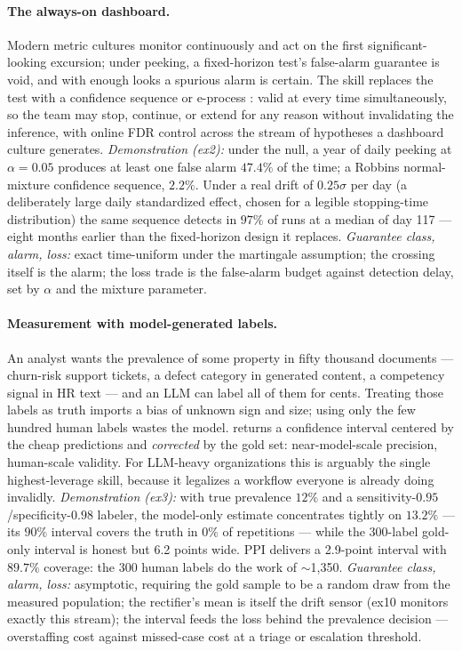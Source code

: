 \documentclass[11pt,a4paper]{article}
\begin{document}
\paragraph{The always-on dashboard.} Modern metric cultures monitor
continuously and act on the first significant-looking excursion; under
peeking, a fixed-horizon test's false-alarm guarantee is void, and with
enough looks a spurious alarm is certain. The 
skill replaces the test with a confidence sequence or e-process
\citep{howard2021,ramdas2023}: valid at every time simultaneously, so the
team may stop, continue, or extend for any reason without invalidating the
inference, with online FDR control across the stream of hypotheses a
dashboard culture generates. \emph{Demonstration (ex2):} under the null, a
year of daily peeking at $\alpha=0.05$ produces at least one false alarm
$47.4\%$ of the time; a Robbins normal-mixture confidence sequence,
$2.2\%$. Under a real drift of $0.25\sigma$ per day (a deliberately large daily
standardized effect, chosen for a legible stopping-time distribution) the
same sequence detects in $97\%$ of runs at a median of day 117 --- eight
months earlier than the fixed-horizon design it replaces. \emph{Guarantee
class, alarm, loss:} exact time-uniform under the martingale assumption;
the crossing itself is the alarm; the loss trade is the false-alarm budget
against detection delay, set by $\alpha$ and the mixture parameter.

\paragraph{Measurement with model-generated labels.} An analyst wants the
prevalence of some property in fifty thousand documents --- churn-risk
support tickets, a defect category in generated content, a competency
signal in HR text --- and an LLM can label all of them for cents. Treating
those labels as truth imports a bias of unknown sign and size; using only
the few hundred human labels wastes the model.
 \citep{angelopoulos2023ppi}
returns a confidence interval centered by the cheap predictions and
\emph{corrected} by the gold set: near-model-scale precision, human-scale
validity. For LLM-heavy organizations this is arguably the single
highest-leverage skill, because it legalizes a workflow everyone is
already doing invalidly. \emph{Demonstration (ex3):} with true prevalence
$12\%$ and a sensitivity-$0.95$/specificity-$0.98$ labeler, the model-only
estimate concentrates tightly on $13.2\%$ --- its $90\%$ interval covers
the truth in $0\%$ of repetitions --- while the 300-label gold-only
interval is honest but 6.2 points wide. PPI delivers a 2.9-point interval
with $89.7\%$ coverage: the 300 human labels do the work of $\sim$1{,}350.
\emph{Guarantee class, alarm, loss:} asymptotic, requiring the gold sample
to be a random draw from the measured population; the rectifier's mean is
itself the drift sensor (ex10 monitors exactly this stream); the interval
feeds the loss behind the prevalence decision --- overstaffing cost
against missed-case cost at a triage or escalation threshold.
\end{document}
